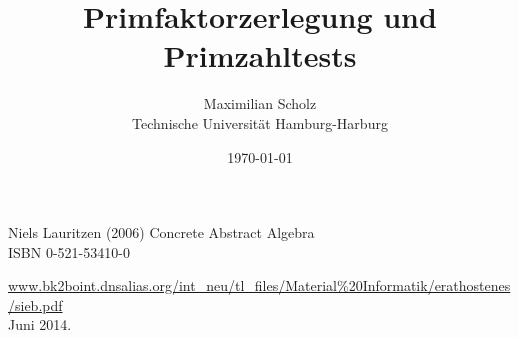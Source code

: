 \documentclass[12pt, a4paper, titlepage]{article}
\title{Primfaktorzerlegung und Primzahltests}
\author{Maximilian Scholz  \\
	Technische Universit\"at Hamburg-Harburg \\
}
\date{\today}
\begin{document}
	\maketitle
	
	\tableofcontents %
	\newpage	
	
	
		
	
	\newpage
	

		\begin{thebibliography}{99}
			Niels Lauritzen (2006)
			\newblock Concrete Abstract Algebra\\
			\newblock ISBN 0-521-53410-0

		\url{www.bk2boint.dnsalias.org/int_neu/tl_files/Material\%20Informatik/erathostenes/sieb.pdf}\\ Juni 2014.
	\end{thebibliography}
	

	
\end{document}
